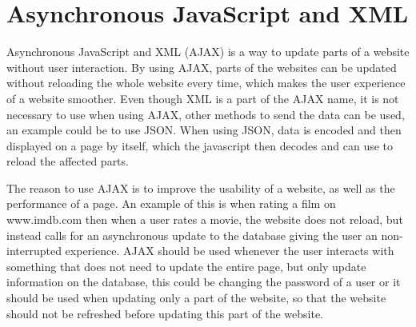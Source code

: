 \section{Asynchronous JavaScript and XML}
Asynchronous JavaScript and XML (AJAX) is a way to update parts of a website without user interaction.
By using AJAX, parts of the websites can be updated without reloading the whole website every time, which makes the user experience of a website smoother.
Even though XML is a part of the AJAX name, it is not necessary to use when using AJAX, other methods to send the data can be used, an example could be to use JSON.
When using JSON, data is encoded and then displayed on a page by itself, which the javascript then decodes and can use to reload the affected parts.

The reason to use AJAX is to improve the usability of a website, as well as the performance of a page.
An example of this is when rating a film on www.imdb.com \citep{misc:imdb} then when a user rates a movie, the website does not reload, but instead calls for an asynchronous update to the database giving the user an non-interrupted experience.
AJAX should be used whenever the user interacts with something that does not need to update the entire page, but only update information on the database, this could be changing the password of a user or it should be used when updating only a part of the website, so that the website should not be refreshed before updating this part of the website.